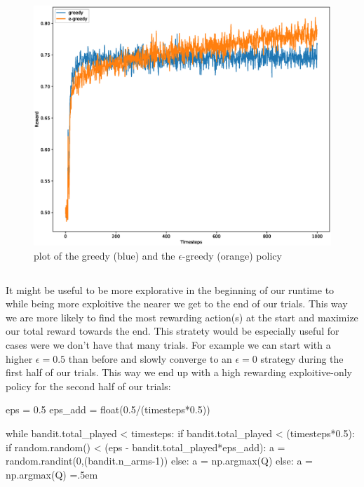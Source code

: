 \documentclass[11pt,a4paper]{article}
\newenvironment{lcverbatim}
 {\SaveVerbatim{cverb}}
 {\endSaveVerbatim
  \flushleft\fboxrule=0pt\fboxsep=.5em
  \colorbox{cverbbg}{%
    \makebox[\dimexpr\linewidth-2\fboxsep][l]{\BUseVerbatim{cverb}}%
  }
  \endflushleft
}
\begin{document}
\begin{figure}[h!]
    \includegraphics[width=.7\textwidth]{fig_esp_greedy.eps}
    \centering
    \caption{plot of the greedy (blue) and the $\epsilon$-greedy (orange) policy}
    \label{fig1}
\end{figure}

\subsection{}

It might be useful to be more explorative in the beginning of our runtime to while being more exploitive 
the nearer we get to the end of our trials. This way we are more likely to find the most rewarding 
action(s) at the start and maximize our total reward towards the end. \newline
This stratety would be especially useful for cases were we don't have that many trials. \newline
For example we can start with a higher $\epsilon=0.5$ than before and slowly converge to an $\epsilon=0$ strategy
during the first half of our trials. This way we end up with a high rewarding exploitive-only policy for the 
second half of our trials: \newpage

\begin{center}
    \begin{lcverbatim}
        eps = 0.5
        eps_add = float(0.5/(timesteps*0.5))

        while bandit.total_played < timesteps:
            if bandit.total_played < (timesteps*0.5):
                if random.random() < (eps - bandit.total_played*eps_add):
                    a = random.randint(0,(bandit.n_arms-1))
                else:
                    a = np.argmax(Q)
            else:
                a = np.argmax(Q)
    \end{lcverbatim}
\end{center}
\end{document}

